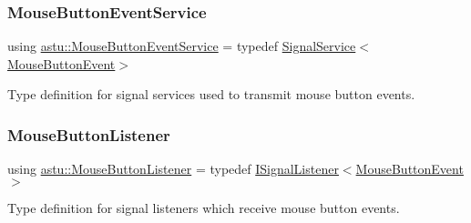 \subsubsection{\texorpdfstring{Mouse\+Button\+Event\+Service}{MouseButtonEventService}}
{\footnotesize\ttfamily using \hyperlink{group__input__group_ga720d9f880198971a77aad9ba69cc3633}{astu\+::\+Mouse\+Button\+Event\+Service} = typedef \hyperlink{classastu_1_1SignalService}{Signal\+Service}$<$\hyperlink{classastu_1_1MouseButtonEvent}{Mouse\+Button\+Event}$>$}

Type definition for signal services used to transmit mouse button events. \mbox{\label{group__input__group_ga4358d168fa211f641ec8176f279f421b}} 
\subsubsection{\texorpdfstring{Mouse\+Button\+Listener}{MouseButtonListener}}
{\footnotesize\ttfamily using \hyperlink{group__input__group_ga4358d168fa211f641ec8176f279f421b}{astu\+::\+Mouse\+Button\+Listener} = typedef \hyperlink{classastu_1_1ISignalListener}{I\+Signal\+Listener}$<$\hyperlink{classastu_1_1MouseButtonEvent}{Mouse\+Button\+Event}$>$}

Type definition for signal listeners which receive mouse button events. 